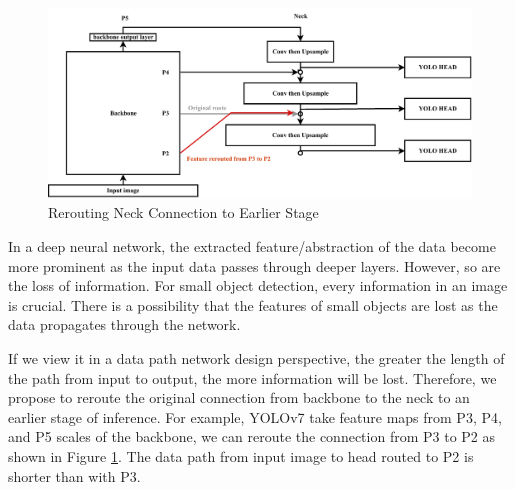   \begin{figure}[H]
    \centering
    \includegraphics[width=.9\textwidth]{figures/neck-move-back.pdf}
    \caption{Rerouting Neck Connection to Earlier Stage}
    \label{fig:neckmoveback}
  \end{figure}
  In a deep neural network, the extracted feature/abstraction of the data become more prominent
  as the input data passes through deeper layers. However, so are the loss of information. 
  For small object detection, every information in an image is crucial. 
  There is a possibility that the features of small objects are lost as the data propagates through the network.
  
  If we view it in a data path network design perspective, the greater the length of the path from input
  to output, the more information will be lost. Therefore, we propose to reroute the original connection from
  backbone to the neck to an earlier stage of inference. For example, YOLOv7 take feature maps from P3, P4, and P5
  scales of the backbone, we can reroute the connection from P3 to P2 as shown in Figure \ref{fig:neckmoveback}.
  The data path from input image to head routed to P2 is shorter than with P3.
